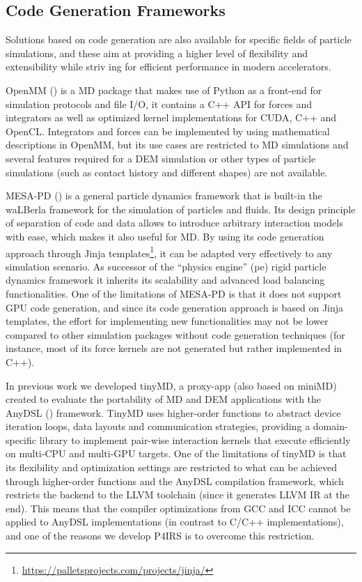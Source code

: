 \documentclass[Afour,sageh,times]{sagej}
\newcommand{\RMchange}[1]{{\color{blue} #1}}
\begin{document}
\subsection{Code Generation Frameworks}
\label{sec:codegen}


Solutions based on code generation are also available for specific fields of particle simulations, and these aim at providing a higher level of flexibility and extensibility while striv\RMchange{ing} for efficient performance in modern accelerators.

OpenMM (\cite{openmm}) is a \ac{MD} package that makes use of Python as a front-end for simulation protocols and file I/O, it contains a C++ API for forces and integrators as well as optimized kernel implementations for CUDA, C++ and OpenCL.
Integrators and forces can be implemented by using mathematical descriptions in OpenMM, but its use cases are restricted to \ac{MD} simulations and several features required for a DEM simulation or other types of particle simulations (such as contact history and different shapes) are not available.

MESA-PD (\cite{mesapd3}) is a general particle dynamics framework that is built-in the waLBerla framework for the simulation of particles and fluids.
Its design principle of separation of code and data allows to introduce arbitrary interaction models with ease, which makes it also useful for \ac{MD}.
By using its code generation approach through Jinja templates\footnote{\url{https://palletsprojects.com/projects/jinja/}}, it can be adapted very effectively to any simulation scenario.
As successor of the ``physics engine'' (pe) rigid particle dynamics framework it inherits its scalability and advanced load balancing functionalities.
One of the limitations of MESA-PD is that it does not support GPU code generation, and since its code generation approach is based on Jinja templates, the effort for implementing new functionalities may not be lower compared to other simulation packages without code generation techniques (for instance, most of its force kernels are not generated but rather implemented in C++).

In previous work we developed tinyMD, a proxy-app (also based on miniMD) created to evaluate the portability of MD and DEM applications with the AnyDSL (\cite{anydsl1,anydsl2}) framework.
TinyMD uses higher-order functions to abstract device iteration loops, data layouts and communication strategies, providing a domain-specific library to implement pair-wise interaction kernels that execute efficiently on multi-CPU and multi-GPU targets.
One of \RMchange{the limitations of tinyMD} is that its flexibility and optimization settings are restricted to what can be achieved through higher-order functions and the AnyDSL compilation framework, which restricts the backend to the LLVM toolchain (since it generates LLVM IR at the end).
This means that the compiler optimizations from GCC and ICC cannot be applied to AnyDSL implementations (in contrast to C/C++ implementations), and one of the reasons we develop P4IRS is to overcome this restriction.
\end{document}
